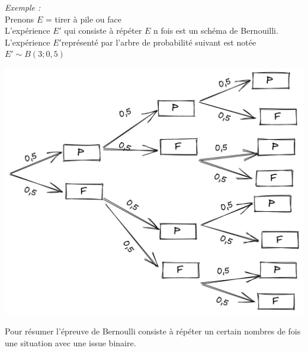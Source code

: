 \documentclass{report}
\begin{document}
\emph{Exemple :} \\
Prenons $E$ = tirer à pile ou face \\
L’expérience $E'$ qui consiste à répéter $E$ n fois est un schéma de Bernouilli. L’expérience $E'$représenté par l’arbre de probabilité suivant est notée $E' \sim B(3;0,5)$

\includegraphics[width=\textwidth]{schema_bernouilli_2.jpg}

Pour résumer l’épreuve de Bernoulli consiste à répéter un certain nombres de fois une situation avec une issue binaire.
\end{document}
